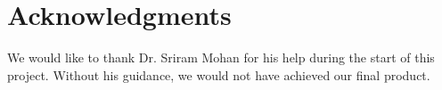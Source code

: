 \documentclass{acm_proc_article-sp}
\begin{document}
\section{Acknowledgments}

We would like to thank Dr. Sriram Mohan for his help during the start of this project. Without his guidance, we would not have achieved our final product.

%

%
\end{document}
